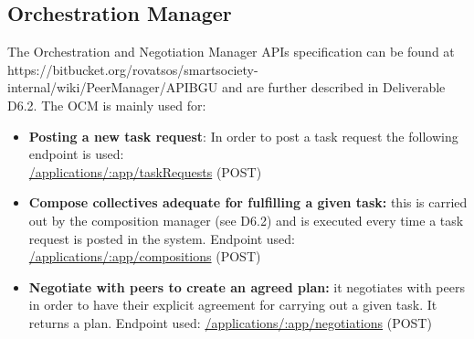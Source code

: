\subsection{Orchestration Manager}
The Orchestration and Negotiation Manager APIs specification can be found at {https://bitbucket.org/rovatsos/smartsociety-internal/wiki/PeerManager/APIBGU} and are further described in Deliverable D6.2. The OCM is mainly used for:
\begin{itemize}
\item {\bf Posting a new task request}: In order to post a task request the following endpoint is used:\\
	\url{/applications/:app/taskRequests} (\textsc{POST})
\item {\bf Compose collectives adequate for fulfilling a given task:} this is carried out by the composition manager (see D6.2) and is executed every time a task request is posted in the system. Endpoint used:
  \url{/applications/:app/compositions} (\textsc{POST})
\item {\bf Negotiate with peers to create an agreed plan:} it negotiates with peers in order to have their explicit agreement for carrying out a given task. It returns a plan. Endpoint used:
  \url{/applications/:app/negotiations} (\textsc{POST})
\end{itemize}
